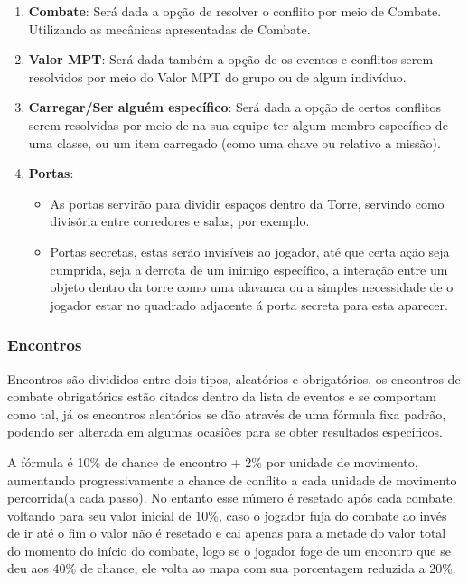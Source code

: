 \documentclass[11pt]{article} %
\begin{document}
\begin{enumerate}
  \item \textbf{Combate}: Será dada a opção de resolver o conflito por meio de Combate. Utilizando as mecânicas apresentadas de Combate.
  \item \textbf{Valor MPT}: Será dada também a opção de os eventos e conflitos serem resolvidos por meio do Valor MPT do grupo ou de algum indivíduo.
  \item \textbf{Carregar/Ser alguém específico}: Será dada a opção de certos conflitos serem resolvidas por meio de na sua equipe ter algum membro específico de uma classe, ou um item carregado (como uma chave ou relativo a missão).
  \\
  \item \textbf{Portas}:
  \begin{itemize}
    \item As portas servirão para dividir espaços dentro da Torre, servindo como divisória entre corredores e salas, por exemplo.
    \item Portas secretas, estas serão invisíveis ao jogador, até que certa ação seja cumprida, seja a derrota de um inimigo específico, a interação entre um objeto dentro da torre como uma alavanca ou a simples necessidade de o jogador estar no quadrado adjacente á porta secreta para esta aparecer.
    \end{itemize}
\end{enumerate}

\subsubsection{Encontros}
Encontros são divididos entre dois tipos, aleatórios e obrigatórios, os encontros de combate obrigatórios estão citados dentro da lista de eventos e se comportam como tal, já os encontros aleatórios se dão através de uma fórmula fixa padrão, podendo ser alterada em algumas ocasiões para se obter resultados específicos.

A fórmula é 10\% de chance de encontro + 2\% por unidade de movimento, aumentando progressivamente a chance de conflito a cada unidade de movimento percorrida(a cada passo). No entanto esse número é resetado após cada combate, voltando para seu valor inicial de 10\%, caso o jogador fuja do combate ao invés de ir até o fim o valor não é resetado e cai apenas para a metade do valor total do momento do início do combate, logo se o jogador foge de um encontro que se deu aos 40\% de chance, ele volta ao mapa com sua porcentagem reduzida a 20\%.
\end{document}

